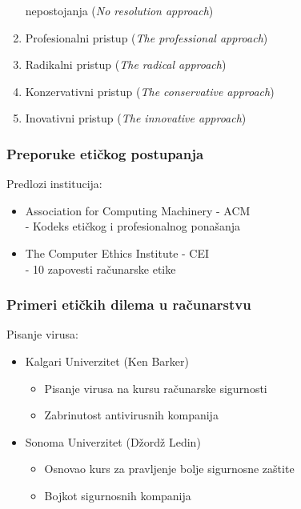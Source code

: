 \documentclass[pdf]{beamer}
\begin{document}
\begin{frame}
\begin{enumerate}
nepostojanja (\textit{No resolution approach})
	\item Profesionalni pristup (\textit{The professional approach})
	\item Radikalni pristup (\textit{The radical approach})
	\item Konzervativni pristup (\textit{The conservative approach})
	\item Inovativni pristup (\textit{The innovative approach})
	\end{enumerate}
	\end{frame}


\begin{frame}
\frametitle{Preporuke etičkog postupanja}

	Predlozi institucija:
	\begin{itemize}
		\item Association for Computing Machinery - ACM %
		\\- Kodeks etičkog i profesionalnog ponašanja %
		\item The Computer Ethics Institute - CEI %
		\\- 10 zapovesti računarske etike %
	\end{itemize}


\end{frame}


\begin{frame}
\frametitle{Primeri etičkih dilema u računarstvu}
		Pisanje virusa:
		\begin{itemize}
		\item Kalgari Univerzitet (Ken Barker)
			\begin{itemize}
			\item Pisanje virusa na kursu računarske sigurnosti
			\item Zabrinutost antivirusnih kompanija 
			\end{itemize}
		
		\item Sonoma Univerzitet (Džordž Ledin)
			\begin{itemize}
			\item Osnovao kurs za pravljenje bolje sigurnosne zaštite
			\item Bojkot sigurnosnih kompanija
			\end{itemize}
		\end{itemize}
\end{frame}
\end{document}

